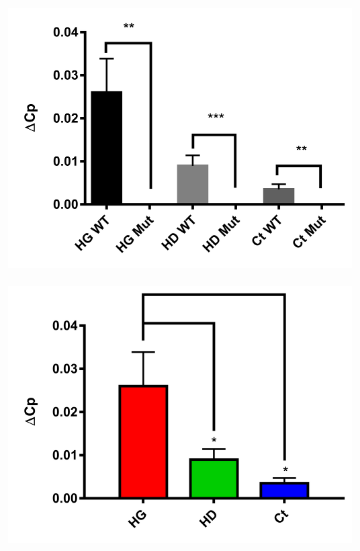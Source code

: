 	\begin{figure}[h]
		\begin{center}
			\begin{subfigure}[h]{0.329\textwidth}
				\caption{}
				\label{fig:qPCRCompaWTMut}
				\includegraphics[width=\textwidth]{./Images/qPCR/Comp_WT-Mut.jpg}
			\end{subfigure}
			\begin{subfigure}[h]{0.329\textwidth}
				\caption{}
				\label{fig:qPCRCompaWT}
				\includegraphics[width=\textwidth]{./Images/qPCR/Comp_Struct_WT.jpg}
			\end{subfigure}
			\begin{subfigure}[h]{0.329\textwidth}
				\caption{}
				\label{fig:qPCRCompaMut}

\end{subfigure}
\end{center}
\end{figure}
